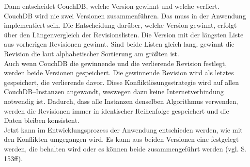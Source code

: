 Dann entscheidet CouchDB, welche Version gewinnt und welche verliert.
CouchDB wird nie zwei Versionen zusammenführen.
Das muss in der Anwendung implementiert sein.
Die Entscheidung darüber, welche Version gewinnt, erfolgt über den Längenvergleich der Revisionslisten.
Die Version mit der längsten Liste aus vorherigen Revisionen gewinnt. Sind beide Listen gleich lang, gewinnt die Revision die laut alphabetischer Sortierung am größten ist.\\
Auch wenn CouchDB die gewinnende und die verlierende Revision festlegt, werden beide Versionen gespeichert.
Die gewinnende Revision wird als letztes gespeichert, die verlierende davor. Diese Konfliktlösungsstrategie wird auf allen CouchDB--Instanzen angewandt, weswegen dazu keine Internetverbindung notwendig ist.
Dadurch, dass alle Instanzen denselben Algorithmus verwenden, werden die Revisionen immer in identischer Reihenfolge gespeichert und die Daten bleiben konsistent.\\
Jetzt kann im Entwicklungsprozess der Anwendung entschieden werden, wie mit den Konflikten umgegangen wird.
Es kann aus beiden Versionen eine festgelegt werden, die behalten wird oder es können beide zusammengeführt werden (vgl. \cite{couchDB} S. 153ff).
%
% 
%
%
